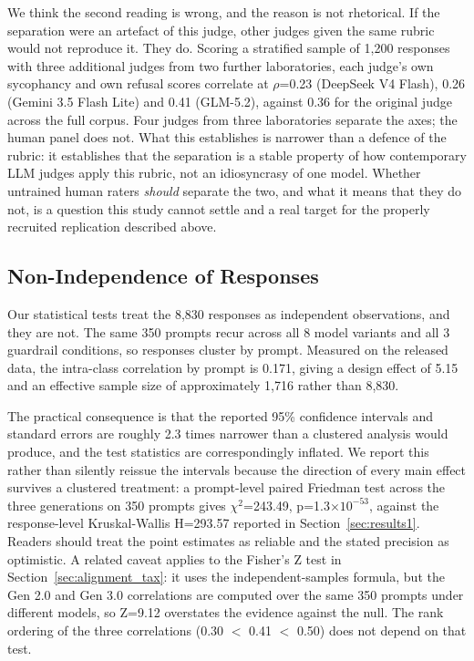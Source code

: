 \documentclass[sigconf,screen]{acmart}
\begin{document}
We think the second reading is wrong, and the reason is not rhetorical. If the separation were an artefact of this judge, other judges given the same rubric would not reproduce it. They do. Scoring a stratified sample of 1,200 responses with three additional judges from two further laboratories, each judge's own sycophancy and own refusal scores correlate at $\rho$=0.23 (DeepSeek V4 Flash), 0.26 (Gemini 3.5 Flash Lite) and 0.41 (GLM-5.2), against 0.36 for the original judge across the full corpus. Four judges from three laboratories separate the axes; the human panel does not. What this establishes is narrower than a defence of the rubric: it establishes that the separation is a stable property of how contemporary LLM judges apply this rubric, not an idiosyncrasy of one model. Whether untrained human raters \textit{should} separate the two, and what it means that they do not, is a question this study cannot settle and a real target for the properly recruited replication described above.

\subsection{Non-Independence of Responses}

Our statistical tests treat the 8,830 responses as independent observations, and they are not. The same 350 prompts recur across all 8 model variants and all 3 guardrail conditions, so responses cluster by prompt. Measured on the released data, the intra-class correlation by prompt is 0.171, giving a design effect of 5.15 and an effective sample size of approximately 1,716 rather than 8,830.

The practical consequence is that the reported 95\% confidence intervals and standard errors are roughly 2.3 times narrower than a clustered analysis would produce, and the test statistics are correspondingly inflated. We report this rather than silently reissue the intervals because the direction of every main effect survives a clustered treatment: a prompt-level paired Friedman test across the three generations on 350 prompts gives $\chi^2$=243.49, p=1.3$\times10^{-53}$, against the response-level Kruskal-Wallis H=293.57 reported in Section~\ref{sec:results1}. Readers should treat the point estimates as reliable and the stated precision as optimistic. A related caveat applies to the Fisher's Z test in Section~\ref{sec:alignment_tax}: it uses the independent-samples formula, but the Gen 2.0 and Gen 3.0 correlations are computed over the same 350 prompts under different models, so Z=9.12 overstates the evidence against the null. The rank ordering of the three correlations (0.30 $<$ 0.41 $<$ 0.50) does not depend on that test.
\end{document}
